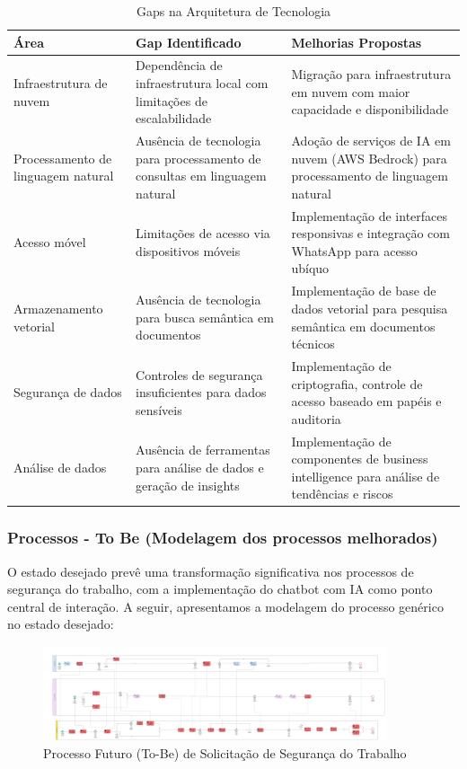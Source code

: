 \documentclass[12pt,a4paper]{article}
\begin{document}
\begin{table}[h]
\centering
\begin{tcolorbox}[enhanced, colback=white, colframe=gray!40, arc=3mm, boxrule=0.5pt]
\scriptsize
\begin{tabular}{|p{2.5cm}|p{4cm}|p{5cm}|}
\hline
\rowcolor{gray!20}
\textbf{Área} & \textbf{Gap Identificado} & \textbf{Melhorias Propostas} \\
\hline
Infraestrutura de nuvem & Dependência de infraestrutura local com limitações de escalabilidade & Migração para infraestrutura em nuvem com maior capacidade e disponibilidade \\
\hline
Processamento de linguagem natural & Ausência de tecnologia para processamento de consultas em linguagem natural & Adoção de serviços de IA em nuvem (AWS Bedrock) para processamento de linguagem natural \\
\hline
Acesso móvel & Limitações de acesso via dispositivos móveis & Implementação de interfaces responsivas e integração com WhatsApp para acesso ubíquo \\
\hline
Armazenamento vetorial & Ausência de tecnologia para busca semântica em documentos & Implementação de base de dados vetorial para pesquisa semântica em documentos técnicos \\
\hline
Segurança de dados & Controles de segurança insuficientes para dados sensíveis & Implementação de criptografia, controle de acesso baseado em papéis e auditoria \\
\hline
Análise de dados & Ausência de ferramentas para análise de dados e geração de insights & Implementação de componentes de business intelligence para análise de tendências e riscos \\
\hline
\end{tabular}
\end{tcolorbox}
\caption{Gaps na Arquitetura de Tecnologia}
\end{table}

\subsubsection{Processos - To Be (Modelagem dos processos melhorados)}

O estado desejado prevê uma transformação significativa nos processos de segurança do trabalho, com a implementação do chatbot com IA como ponto central de interação. A seguir, apresentamos a modelagem do processo genérico no estado desejado:

\begin{figure}[H]
\centering
\includegraphics[width=0.9\textwidth]{images/TO-BE.jpg}
\caption{Processo Futuro (To-Be) de Solicitação de Segurança do Trabalho}
\end{figure}
\end{document}
